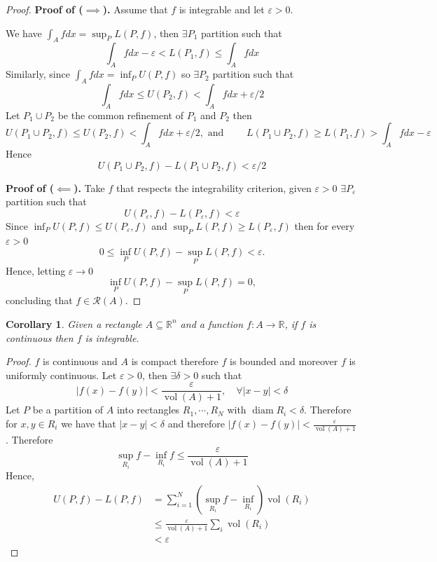 \documentclass[11pt,openany]{book}
\theoremstyle{plain}
\newtheorem{corollary}{Corollary}[chapter]
\theoremstyle{definition}
\theoremstyle{remark}
\newcommand{\R}{\mathbb{R}}
\newcommand{\vol}{\operatorname{vol}}
\begin{document}
\begin{proof}
        {\bf Proof of ($\implies$).} Assume that $f$ is integrable and let $\varepsilon > 0$. 

        We have $\int_A f dx = \sup_P L(P, f)$, then $\exists P_1$ partition such that 
        $$\int_A f dx - \varepsilon < L(P_1, f) \le \int_A f dx$$
        Similarly, since $\int_A f dx = \inf_P U(P, f)$ so $\exists P_2$ partition such that 
        $$\int_A f dx \le U(P_2, f) < \int_A f dx + \varepsilon/2$$
        Let $ P_1 \cup P_2$ be the common refinement of $P_1$ and $P_2$ then 
        $$U(P_1\cup P_2, f) \le U(P_2, f) < \int_A f dx + \varepsilon/2,\text{ and } \qquad
        L(P_1\cup P_2, f) \ge L(P_1, f) > \int_A f dx - \varepsilon$$
        Hence 
        $$U(P_1\cup P_2,f) - L(P_1\cup P_2,f) <\varepsilon/2$$

        {\bf Proof of ($\impliedby$).} Take $f$ that respects the integrability criterion, given $\varepsilon > 0$ $\exists P_\varepsilon$ partition such that 
        $$U(P_\varepsilon, f) - L(P_\varepsilon, f) < \varepsilon$$
        Since $\inf_PU(P,f)\leq U(P_{\varepsilon},f)$ and $\sup_PL(P,f)\geq L(P_\varepsilon,f)$ then for every $\varepsilon>0$
        $$0 \leq \inf_P U(P, f) - \sup_P L(P,f)< \varepsilon.$$
        Hence, letting $\varepsilon\to 0$
        $$\inf_P U(P,f) - \sup_P L(P,f) = 0,$$
        concluding that $f\in \mathcal R(A).$
\end{proof}

\begin{corollary}
    Given a rectangle $A \subseteq \R^n$ and a function $f \colon A \to \R$, if $f$ is continuous then $f$ is integrable. 
\end{corollary}

\begin{proof}
    $f$ is continuous and $A$ is compact therefore $f$ is bounded and moreover $f$ is uniformly continuous. 
    Let $\varepsilon > 0$, then $\exists \delta > 0$ such that 
    $$|f(x) - f(y)| < \frac{\varepsilon}{\vol (A) + 1}, \quad \forall |x-y| < \delta$$
    Let $P$ be a partition of $A$ into rectangles $R_1, \cdots, R_N$ with $\operatorname{diam} R_i < \delta$. 
    Therefore for $x, y \in R_i$ we have that $|x-y| < \delta$ and therefore 
    $|f(x) - f(y)| < \frac{\varepsilon}{\vol (A) + 1}$. Therefore 
    $$\sup_{R_i} f - \inf_{R_i} f \le \frac{\varepsilon}{\vol (A) + 1}$$
    Hence,
    \begin{align*}
        U(P,f) - L(P,f) &= \sum_{i=1}^N (\sup_{R_i} f - \inf_{R_i}) \vol (R_i) \\
        &\le \frac{\varepsilon}{\vol(A) + 1} \sum_i \vol (R_i) \\
        &< \varepsilon
    \end{align*}
\end{proof}
\end{document}
